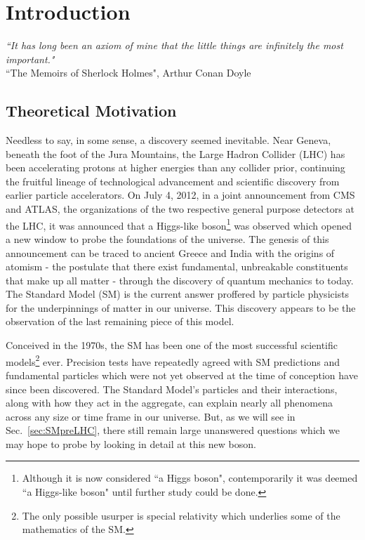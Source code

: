 \chapter{Introduction}
\label{sec:intro}

\begin{center}
\begin{footnotesize}
{ \it{``It has long been an axiom of mine that the little things are infinitely the most important."}}\\
``The Memoirs of Sherlock Holmes", Arthur Conan Doyle\\
\end{footnotesize}
\end{center}

\section{Theoretical Motivation}
\label{sec:Introduction}

Needless to say, in some sense, a discovery seemed inevitable. Near Geneva, beneath the foot of the Jura Mountains, the Large Hadron Collider (LHC) has been accelerating protons at higher energies than any collider prior, continuing the fruitful lineage of technological advancement and scientific discovery from earlier particle accelerators. On July 4, 2012, in a joint announcement from CMS and ATLAS, the organizations of the two respective general purpose detectors at the LHC, it was announced that a Higgs-like boson\footnote{Although it is now considered ``a Higgs boson", contemporarily it was deemed ``a Higgs-like boson" until further study could be done.} was observed which opened a new window to probe the foundations of the universe. The genesis of this announcement can be traced to ancient Greece and India with the origins of atomism - the postulate that there exist fundamental, unbreakable constituents that make up all matter - through the discovery of quantum mechanics to today. The Standard Model (SM) is the current answer proffered by particle physicists for the underpinnings of matter in our universe. This discovery appears to be the observation of the last remaining piece of this model.

Conceived in the 1970s, the SM has been one of the most successful scientific models\footnote{The only possible usurper is special relativity which underlies some of the mathematics of the SM.} ever. Precision tests have repeatedly agreed with SM predictions and fundamental particles which were not yet observed at the time of conception have since been discovered. The Standard Model's particles and their interactions, along with how they act in the aggregate, can explain nearly all phenomena across any size or time frame in our universe. But, as we will see in Sec.~\ref{sec:SMpreLHC}, there still remain large unanswered questions which we may hope to probe by looking in detail at this new boson.

